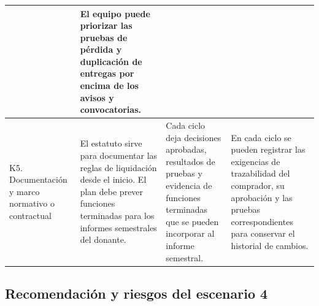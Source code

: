 \begin{center}
\begin{tabularx}{\textwidth}{|>{\raggedright\arraybackslash}p{2.6cm}|L|L|L|}
& El equipo puede priorizar las pruebas de pérdida y duplicación de entregas por encima de los avisos y convocatorias.
\\ \hline
K5. Documentación y marco normativo o contractual
& El estatuto sirve para documentar las reglas de liquidación desde el inicio. El plan debe prever funciones terminadas para los informes semestrales del donante.
& Cada ciclo deja decisiones aprobadas, resultados de pruebas y evidencia de funciones terminadas que se pueden incorporar al informe semestral.
& En cada ciclo se pueden registrar las exigencias de trazabilidad del comprador, su aprobación y las pruebas correspondientes para conservar el historial de cambios.
\\ \hline
\end{tabularx}
\end{center}

\subsection{Recomendación y riesgos del escenario 4}

